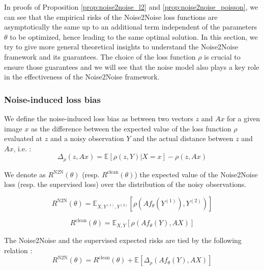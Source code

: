 In proofs of Proposition \ref{prop:noise2noise_l2} and \ref{prop:noise2noise_poisson}, we can see that the empirical risks of the Noise2Noise loss functions are asymptotically the same
up to an additional term independent of the parameters $\theta$ to be optimized, hence leading to the same optimal solution.
In this section, we try to give more general theoretical insights to understand the Noise2Noise framework and its guarantees.
The choice of the loss function $\rho$ is crucial to ensure those guarantees and we will see that the noise model also plays a key role in the effectiveness of the Noise2Noise framework.

\subsubsection{Noise-induced loss bias}

\begin{definition}
    We define the noise-induced loss bias as between two vectors $z$ and $Ax$ for a given image $x$ as the difference between the expected value of the loss function $\rho$ evaluated at $z$ and a noisy observation $Y$ and the actual distance between $z$ and $Ax$, i.e. :
    \begin{equation}
        \Delta_\rho(z, Ax) = \mathbb{E}[\rho(z, Y) | X=x] - \rho(z, Ax)
    \end{equation}
\end{definition}

We denote as $R^{\text{N2N}}(\theta)$ (resp. $R^{\text{clean}}(\theta)$) the expected value of the Noise2Noise loss (resp. the supervised loss) over the distribution of the noisy observations.

\begin{equation}
    R^{\text{N2N}}(\theta) = \mathbb{E}_{X, Y^{(1)}, Y^{(2)}}[\rho(Af_\theta(Y^{(1)}), Y^{(2)})]
\end{equation}

\begin{equation}
    R^{\text{clean}}(\theta) = \mathbb{E}_{X, Y}[\rho(Af_\theta(Y), AX)]
\end{equation}

\begin{proposition}
    The Noise2Noise and the supervised expected risks are tied by the following relation :
    \begin{equation}
        R^{\text{N2N}}(\theta) = R^{\text{clean}}(\theta) + \mathbb{E}[\Delta_\rho(Af_\theta(Y), AX)]
    \end{equation}
\end{proposition}

